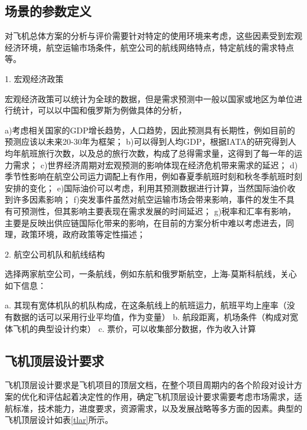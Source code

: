 \documentclass[12pt,a4paper]{report}
\begin{document}
\subsection{场景的参数定义}

对飞机总体方案的分析与评价需要针对特定的使用环境来考虑，这些因素受到宏观经济环境，航空运输市场条件，航空公司的航线网络特点，特定航线的需求特点等。

1. 宏观经济政策

宏观经济政策可以统计为全球的数据，但是需求预测中一般以国家或地区为单位进行统计，可以以中国和俄罗斯为例做具体的分析，

a)考虑相关国家的GDP增长趋势，人口趋势，因此预测具有长期性，例如目前的预测应该以未来20-30年为框架；
b)可以得到人均GDP，根据IATA的研究得到人均年航班旅行次数，以及总的旅行次数，构成了总得需求量，这得到了每一年的运力需求；
c)世界经济周期对宏观预测的影响体现在经济危机带来需求的延迟；
d)季节性影响在航空公司运力调配上有作用，例如春夏季航班时刻和秋冬季航班时刻安排的变化；
e)国际油价可以考虑，利用其预测数据进行计算，当然国际油价收到许多因素影响；
f)突发事件虽然对航空运输市场会带来影响，事件的发生不具有可预测性，但其影响主要表现在需求发展的时间延迟；
g)税率和汇率有影响，主要是反映出供应链国际化带来的影响，在目前的方案分析中难以考虑进去，同理，政策环境，政府政策等定性描述；

2. 航空公司机队和航线结构

选择两家航空公司，一条航线，例如东航和俄罗斯航空，上海-莫斯科航线，关心如下信息：

a. 其现有宽体机队的机队构成，在这条航线上的航班运力，航班平均上座率（没有数据的话可以采用行业平均值，作为变量）
b. 航段距离，机场条件（构成对宽体飞机的典型设计约束）
c. 票价，可以收集部分数据，作为收入计算

\subsection{飞机顶层设计要求}

飞机顶层设计要求是飞机项目的顶层文档，在整个项目周期内的各个阶段对设计方案的优化和评估起着决定性的作用，确定飞机顶层设计要求需要考虑市场需求，适航标准，技术能力，进度要求，资源需求，以及发展战略等多方面的因素。典型的飞机顶层设计如表\ref{tlar}所示。
\end{document}
